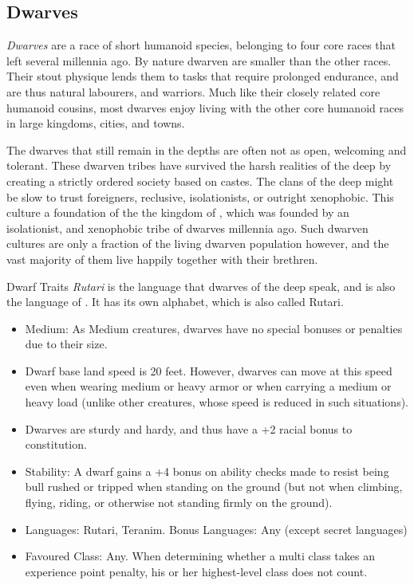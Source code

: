 \subsection{Dwarves}
\label{sec:Dwarves}

\emph{Dwarves} are a race of short humanoid species, belonging to four core
races that left  several millennia ago. By nature dwarven
are smaller than the other races. Their stout physique lends them to tasks that
require prolonged endurance, and are thus natural labourers, and warriors.
Much like their closely related core humanoid cousins, most dwarves enjoy
living with the other core humanoid races in large kingdoms, cities, and
towns.

The dwarves that still remain in the depths are often not as open, welcoming
and tolerant. These dwarven tribes have survived the harsh realities of the
deep by creating a strictly ordered society based on castes. The clans of the
deep might be slow to trust foreigners, reclusive, isolationists, or outright
xenophobic. This culture a foundation of the the kingdom of
, which was founded by an isolationist, and xenophobic
tribe of dwarves millennia ago. Such dwarven cultures are only a fraction of
the living dwarven population however, and the vast majority of them live
happily together with their brethren.

\begin{35e}{Dwarf Traits}
  \emph{Rutari} is the language that dwarves of the deep speak, and is also
  the language of . It has its own alphabet, which is
  also called Rutari.

  \begin{itemize}[noitemsep]
    \item Medium: As Medium creatures, dwarves have no special bonuses or
      penalties due to their size.
    \item Dwarf base land speed is 20 feet. However, dwarves can move at this
      speed even when wearing medium or heavy armor or when carrying a medium or
      heavy load (unlike other creatures, whose speed is reduced in such
      situations).
    \item Dwarves are sturdy and hardy, and thus have a +2 racial bonus to
      constitution.
    \item Stability: A dwarf gains a +4 bonus on ability checks made to resist
      being bull rushed or tripped when standing on the ground (but not when
      climbing, flying, riding, or otherwise not standing firmly on the
      ground).
    \item Languages: Rutari, Teranim. Bonus Languages: Any (except secret
      languages)
    \item Favoured Class: Any. When determining whether a multi class takes an
          experience point penalty, his or her highest-level class does not
          count.
  \end{itemize}
\end{35e}
